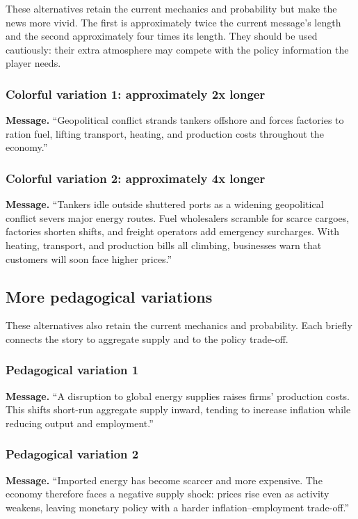 \documentclass[11pt]{article}
\newcommand{\eventmessage}{\textbf{Message.} }
\begin{document}
These alternatives retain the current mechanics and probability but make the
news more vivid.  The first is approximately twice the current message's length
and the second approximately four times its length.  They should be used
cautiously: their extra atmosphere may compete with the policy information the
player needs.

\subsubsection{Colorful variation 1: approximately 2x longer}
\eventmessage ``Geopolitical conflict strands tankers offshore and forces factories to ration fuel, lifting transport, heating, and production costs throughout the economy.''

\subsubsection{Colorful variation 2: approximately 4x longer}
\eventmessage ``Tankers idle outside shuttered ports as a widening geopolitical conflict severs major energy routes. Fuel wholesalers scramble for scarce cargoes, factories shorten shifts, and freight operators add emergency surcharges. With heating, transport, and production bills all climbing, businesses warn that customers will soon face higher prices.''

\subsection{More pedagogical variations}

These alternatives also retain the current mechanics and probability.  Each
briefly connects the story to aggregate supply and to the policy trade-off.

\subsubsection{Pedagogical variation 1}
\eventmessage ``A disruption to global energy supplies raises firms' production costs. This shifts short-run aggregate supply inward, tending to increase inflation while reducing output and employment.''

\subsubsection{Pedagogical variation 2}
\eventmessage ``Imported energy has become scarcer and more expensive. The economy therefore faces a negative supply shock: prices rise even as activity weakens, leaving monetary policy with a harder inflation--employment trade-off.''
\end{document}
